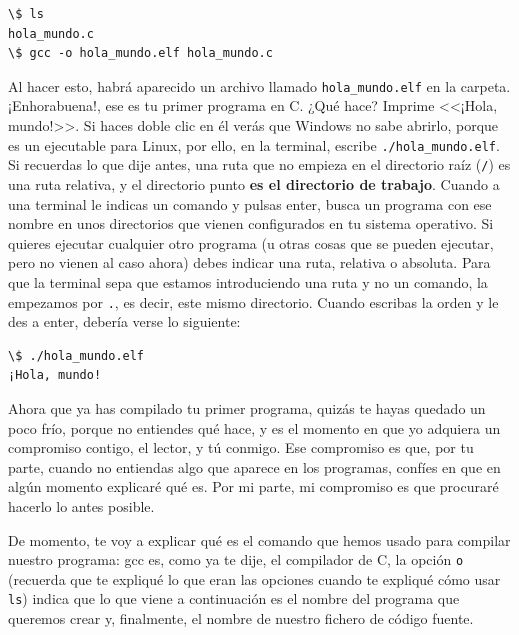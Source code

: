 \documentclass[a4paper]{article}
\begin{document}
\noindent
\begin{minipage}[H]{\linewidth}
\mbox{}
\begin{lstlisting}[style=terminalStyle]
\$ ls
hola_mundo.c
\$ gcc -o hola_mundo.elf hola_mundo.c
\end{lstlisting}
\end{minipage}


Al hacer esto, habrá aparecido un archivo llamado \verb!hola_mundo.elf! en la
carpeta. ¡Enhorabuena!, ese es tu primer programa en C. ¿Qué hace? Imprime
<<¡Hola, mundo!>>. Si haces doble clic en él verás que Windows no sabe abrirlo,
porque es un ejecutable para Linux, por ello, en la terminal, escribe
\verb!./hola_mundo.elf!. Si recuerdas lo que dije antes, una ruta que no empieza
en el directorio raíz (\verb!/!) es una ruta relativa, y el directorio punto
\textbf{es el directorio de trabajo}. Cuando a una terminal le indicas un
comando y pulsas enter, busca un programa con ese nombre en unos directorios
que vienen configurados en tu sistema operativo. Si quieres ejecutar cualquier
otro programa (u otras cosas que se pueden ejecutar, pero no vienen al caso
ahora) debes indicar una ruta, relativa o absoluta. Para que la terminal
sepa que estamos introduciendo una ruta y no un comando, la empezamos por
\verb!.!, es decir, este mismo directorio. Cuando escribas la orden y le des
a enter, debería verse lo siguiente:

\noindent
\begin{minipage}[H]{\linewidth}
\mbox{}
\begin{lstlisting}[style=terminalStyle]
\$ ./hola_mundo.elf
¡Hola, mundo!
\end{lstlisting}
\end{minipage}


Ahora que ya has compilado tu primer programa, quizás te hayas quedado un poco
frío, porque no entiendes qué hace, y es el momento en que yo adquiera un
compromiso contigo, el lector, y tú conmigo. Ese compromiso es que, por tu
parte, cuando no entiendas algo que aparece en los programas, confíes en que
en algún momento explicaré qué es. Por mi parte, mi compromiso es que procuraré
hacerlo lo antes posible.

De momento, te voy a explicar qué es el comando que hemos usado para compilar
nuestro programa: gcc es, como ya te dije, el compilador de C, la opción
\texttt{o} (recuerda que te expliqué lo que eran las opciones cuando te expliqué
cómo usar \verb!ls!) indica que lo que viene a continuación es el nombre del
programa que queremos crear y, finalmente, el nombre de nuestro fichero de
código fuente.
\end{document}
